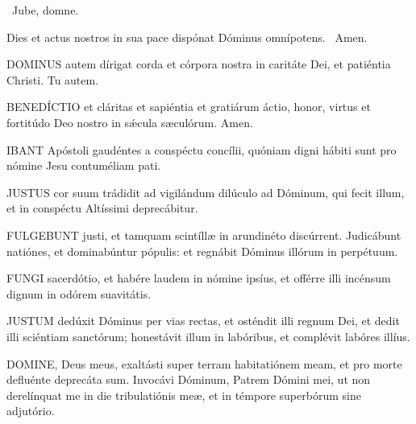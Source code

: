 \V\ Jube, domne.

 Dies et actus nostros in sua pace dispónat Dóminus omnípotens. \R\ Amen.


\lettrine[lines=2]{D}{OMINUS} autem dírigat corda et córpora nostra in caritáte Dei, et patiéntia Christi. Tu autem.



\lettrine[lines=2]{B}{ENEDÍCTIO} et cláritas et sapiéntia et gratiárum áctio, honor, virtus et fortitúdo Deo nostro in sǽcula sæculórum. Amen.



\lettrine[lines=2]{I}{BANT} Apóstoli gaudéntes a conspéctu concílii, quóniam digni hábiti sunt pro nómine Jesu contuméliam pati.


\lettrine[lines=2]{J}{USTUS} cor suum trádidit ad vigilándum dilúculo ad Dóminum, qui fecit illum, et in conspéctu Altíssimi deprecábitur.


\lettrine[lines=2]{F}{ULGEBUNT} justi, et tamquam scintíllæ in arundinéto discúrrent. Judicábunt natiónes, et dominabúntur pópulis: et regnábit Dóminus illórum in perpétuum.


\lettrine[lines=2]{F}{UNGI} sacerdótio, et habére laudem in nómine ipsíus, et offérre illi incénsum dignum in odórem suavitátis.


\lettrine[lines=2]{J}{USTUM} dedúxit Dóminus per vias rectas, et osténdit illi regnum Dei, et dedit illi sciéntiam sanctórum; honestávit illum in labóribus, et complévit labóres illíus.


\lettrine[lines=2]{D}{OMINE}, Deus meus, exaltásti super terram habitatiónem meam, et pro morte defluénte deprecáta sum. Invocávi Dóminum, Patrem Dómini mei, ut non derelínquat me in die tribulatiónis meæ, et in témpore superbórum sine adjutório.


